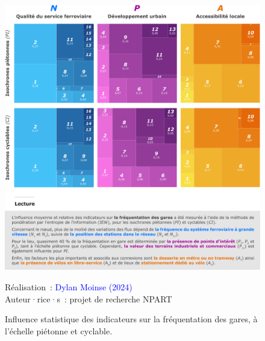 \begin{refsegment}
    \begin{figure}[h!]\vspace*{4pt}
        \caption{Influence statistique des indicateurs sur la fréquentation des gares, à l'échelle piétonne et cyclable.}
        \label{fig-chap6:resultats-poids-iew-statistiques}
        \centerline{\includegraphics[width=1\columnwidth]{src/Figures/Chap-6/FR_NPART_Poids_Statistiques_IEW_Indicateurs.pdf}}
        \vspace{5pt}
        \begin{flushright}\scriptsize{
        Réalisation~: \textcolor{blue}{Dylan Moinse (2024)}
        \\
        Auteur·rice·s~: projet de recherche \acrshort{NPART}
        }\end{flushright}
    \end{figure}


\end{refsegment}
